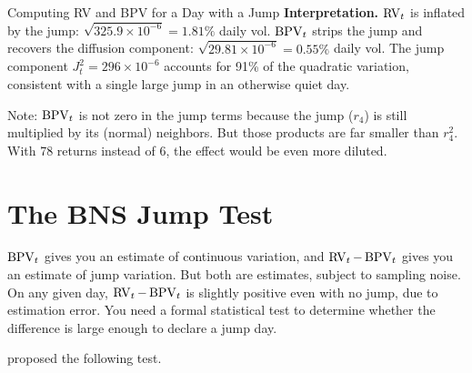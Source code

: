 \begin{workedexample}{Computing RV and BPV for a Day with a Jump}
\textbf{Interpretation.}
$\operatorname{RV}_t$ is inflated by the jump: $\sqrt{325.9 \times 10^{-6}} = 1.81\%$ daily vol.
$\operatorname{BPV}_t$ strips the jump and recovers the diffusion component: $\sqrt{29.81 \times 10^{-6}} = 0.55\%$ daily vol.
The jump component $J_t^2 = 296 \times 10^{-6}$ accounts for 91\% of the quadratic variation, consistent with a single large jump in an otherwise quiet day.

Note: $\operatorname{BPV}_t$ is not zero in the jump terms because the jump ($r_4$) is still multiplied by its (normal) neighbors.
But those products are far smaller than $r_4^2$.
With 78 returns instead of 6, the effect would be even more diluted.
\end{workedexample}


\section{The BNS Jump Test}
\label{sec:bns-test}

$\operatorname{BPV}_t$ gives you an estimate of continuous variation, and $\operatorname{RV}_t - \operatorname{BPV}_t$ gives you an estimate of jump variation.
But both are estimates, subject to sampling noise.
On any given day, $\operatorname{RV}_t - \operatorname{BPV}_t$ is slightly positive even with no jump, due to estimation error.
You need a formal statistical test to determine whether the difference is large enough to declare a jump day.

\citet{BNS2006} proposed the following test.

